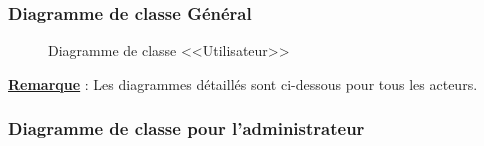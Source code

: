 \documentclass[12pt]{report}
\begin{document}
\vspace{0.1in}

\subsubsection{Diagramme de classe Général}

\vspace{0.1in}

\begin{figure}[h]
\centering
    \centerline{}
    \caption{Diagramme de classe <<Utilisateur>>}
\end{figure}

\textbf{\uline{Remarque}} : Les diagrammes détaillés sont ci-dessous pour tous les acteurs.

\newpage

\subsubsection{Diagramme de classe pour l'administrateur}
\end{document}
